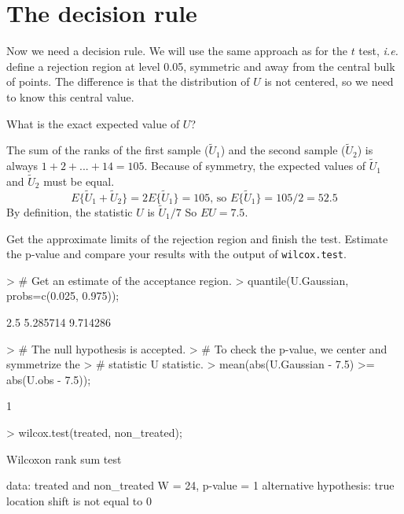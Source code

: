\documentclass[a4paper]{article}
\theoremstyle{definition}
\begin{document}
\section{The decision rule}

Now we need a decision rule. We will use the same approach as
for the $t$ test, \textit{i.e.} define a rejection region at level
0.05, symmetric and away from the central bulk of points. The
difference is that the distribution of $U$ is not centered,
so we need to know this central value.

\begin{Exercise}
What is the exact expected value of $U$?
\end{Exercise}
\begin{Answer}
The sum of the ranks of the first sample ($\tilde{U}_1$) and the
second sample ($\tilde{U}_2$) is always $1+2+...+14 = 105$.
Because of symmetry, the expected values of $\tilde{U}_1$ and
$\tilde{U}_2$ must be equal.
\begin{equation*}
   E\{\tilde{U}_1 + \tilde{U}_2\} = 2 E\{\tilde{U}_1\} = 105 \mbox{, so }
   E \{\tilde{U}_1\} = 105/2 = 52.5
\end{equation*}
By definition, the statistic $U$ is $\tilde{U}_1/7$ So $E{U}=7.5$.
\end{Answer}

\begin{Exercise}
Get the approximate limits of the rejection region and finish the
test. Estimate the p-value and compare your results with the output
of \texttt{wilcox.test}.
\end{Exercise}
\begin{Answer}
\begin{Schunk}
\begin{Sinput}
> # Get an estimate of the acceptance region.
> quantile(U.Gaussian, probs=c(0.025, 0.975));
\end{Sinput}
\begin{Soutput}
    2.5%
5.285714 9.714286 
\end{Soutput}
\begin{Sinput}
> # The null hypothesis is accepted.
> # To check the p-value, we center and symmetrize the
> # statistic U statistic.
> mean(abs(U.Gaussian - 7.5) >= abs(U.obs - 7.5));
\end{Sinput}
\begin{Soutput}
[1] 1
\end{Soutput}
\begin{Sinput}
> wilcox.test(treated, non_treated);
\end{Sinput}
\begin{Soutput}
	Wilcoxon rank sum test

data:  treated and non_treated 
W = 24, p-value = 1
alternative hypothesis: true location shift is not equal to 0 
\end{Soutput}
\end{Schunk}
\end{Answer}

\cleardoublepage
\shipoutAnswer
\end{document}
